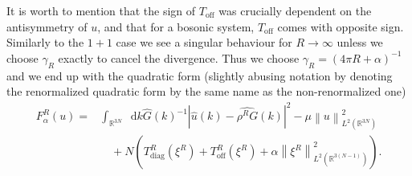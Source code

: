 \documentclass[a4paper,11pt]{article}
\newcommand{\norm}[1]{\left\lVert #1 \right\rVert}
\newcommand*\diff{\mathop{}\!\mathrm{d}}
\newcommand{\R}{\mathbb{R}}
\numberwithin{equation}{section}
\begin{document}
It is worth to mention that the sign of $ T_{\text{off}} $ was crucially dependent on the antisymmetry of $ u $, and that for a bosonic system, $ T_{\text{off}} $ comes with opposite sign. Similarly to the $ 1+1 $ case we see a singular behaviour for $ R\to\infty $ unless we choose $ \gamma_R $ exactly to cancel the divergence. Thus we choose $ \gamma_R=(4\pi R +\alpha)^{-1} $ and we end up with the quadratic form (slightly abusing notation by denoting the renormalized quadratic form by the same name as the non-renormalized one) \begin{equation}
\begin{aligned}
F_\alpha^R(u)=&\int_{\R^{3N}}\diff k \hat{G}(k)^{-1}|\hat{u}(k)-\widehat{\rho^R G}(k)|^2-\mu\norm{u}^2_{L^2(\R^{3N})}\\&\quad+N\left(T^R_{\text{diag}}(\xi^R)+T^R_{\text{off}}(\xi^R)+\alpha\norm{\xi^R}_{L^2(\R^{3(N-1)})}^2\right).
\end{aligned}
\end{equation}
\end{document}
